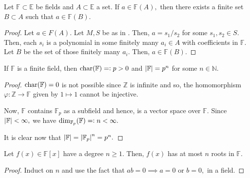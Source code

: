 \begin{cor} \label{cor:FAdescfinite}
    Let $\mathbb{F} \subset \mathbb{E}$ be fields and $A \subset \mathbb{E}$ a set. If $a \in \mathbb{F}(A),$ then there exists a finite set $B \subset A$ such that $a \in \mathbb{F}(B).$
\end{cor}

\begin{proof} 
    Let $a \in F(A).$ Let $M, S$ be as in . Then, $a = s_1/s_2$ for some $s_1, s_2 \in S.$ Then, each $s_i$ is a polynomial in some finitely many $a_i \in A$ with coefficients in $\mathbb{F}.$ Let $B$ be the set of those finitely many $a_i.$ Then, $a \in \mathbb{F}(B).$
\end{proof}

\begin{prop}
    If $\mathbb{F}$ is a finite field, then $\operatorname{char}(\mathbb{F}) =\vcentcolon p > 0$ and ${\left\lvert \mathbb{F} \right\lvert} = p^n$ for some $n \in \mathbb{N}.$
\end{prop}
\begin{proof} 
    $\operatorname{char}(\mathbb{F}) = 0$ is not possible since $\mathbb{Z}$ is infinite and so, the homomorphism $\varphi : \mathbb{Z} \to \mathbb{F}$ given by $1 \mapsto 1$ cannot be injective.

    Now, $\mathbb{F}$ contains $\mathbb{F}_p$ as a subfield and hence, is a vector space over $\mathbb{F}.$ Since ${\left\lvert \mathbb{F} \right\lvert} < \infty,$ we have $\dim_{\mathbb{F}_p}(\mathbb{F}) =\vcentcolon n < \infty.$

    It is clear now that ${\left\lvert \mathbb{F} \right\lvert} = {\left\lvert \mathbb{F}_p \right\lvert}^n = p^n.$
\end{proof}

\begin{thm}
    Let $f(x) \in \mathbb{F}[x]$ have a degree $n \ge 1.$ Then, $f(x)$ has at most $n$ roots in $\mathbb{F}.$
\end{thm}
\begin{proof} 
    Induct on $n$ and use the fact that $ab = 0 \implies a = 0$ or $b = 0,$ in a field.
\end{proof}

